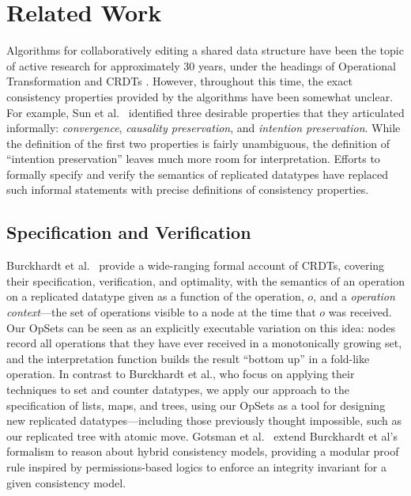 \section{Related Work}\label{sec:relwork}

Algorithms for collaboratively editing a shared data structure have been the topic of active research for approximately 30 years, under the headings of Operational Transformation \cite{Ellis:1989ue,Ressel:1996wx,Sun:1998vf,Oster:2006tr} and CRDTs \cite{Shapiro:2011wy,Shapiro:2011un}.
However, throughout this time, the exact consistency properties provided by the algorithms have been somewhat unclear.
For example, Sun et al.~\cite{Sun:1998un} identified three desirable properties that they articulated informally: \emph{convergence}, \emph{causality preservation}, and \emph{intention preservation}.
While the definition of the first two properties is fairly unambiguous, the definition of ``intention preservation'' leaves much more room for interpretation.
Efforts to formally specify and verify the semantics of replicated datatypes have replaced such informal statements with precise definitions of consistency properties.

\subsection{Specification and Verification}

Burckhardt et al.~\cite{Burckhardt:2014ft} provide a wide-ranging formal account of CRDTs, covering their specification, verification, and optimality, with the semantics of an operation on a replicated datatype given as a function of the operation, $o$, and a \emph{operation context}---the set of operations visible to a node at the time that $o$ was received.
Our OpSets can be seen as an explicitly executable variation on this idea: nodes record all operations that they have ever received in a monotonically growing set, and the interpretation function builds the result ``bottom up'' in a fold-like operation.
In contrast to Burckhardt et al., who focus on applying their techniques to set and counter datatypes, we apply our approach to the specification of lists, maps, and trees, using our OpSets as a tool for designing new replicated datatypes---including those previously thought impossible, such as our replicated tree with atomic move.
Gotsman et al.~\cite{DBLP:conf/popl/GotsmanYFNS16} extend Burckhardt et al's formalism to reason about hybrid consistency models, providing a modular proof rule inspired by permissions-based logics to enforce an integrity invariant for a given consistency model.

